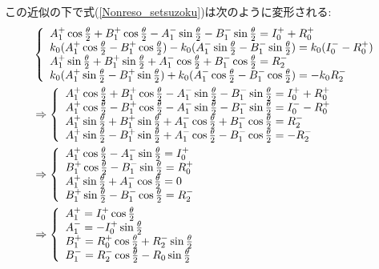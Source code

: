 この近似の下で式(\ref{Nonreso_setsuzoku})は次のように変形される:
\begin{align}
&\left\{\begin{array}{l}
A_1^+ \cos \frac{\theta}{2} +B_1^+\cos \frac{\theta}{2} -A_1^-\sin\frac{\theta}{2} -B_1^-\sin\frac{\theta}{2} = I_0^+ +R_0^+ \\
k_0(A_1^+ \cos \frac{\theta}{2} -B_1^+\cos \frac{\theta}{2} )-k_0(A_1^-\sin\frac{\theta}{2} -B_1^-\sin\frac{\theta}{2} )=k_0(I_0^--R_0^+)\\
A_1^+ \sin \frac{\theta}{2} +B_1^+\sin \frac{\theta}{2} +A_1^-\cos\frac{\theta}{2} +B_1^-\cos\frac{\theta}{2} = R_2^- \\
k_0(A_1^+ \sin \frac{\theta}{2} -B_1^+\sin \frac{\theta}{2}) +k_0(A_1^-\cos\frac{\theta}{2} -B_1^-\cos\frac{\theta}{2}) = -k_0R_2^-
\end{array} \right.  \notag \\
&\Rightarrow \left\{\begin{array}{l}
A_1^+ \cos \frac{\theta}{2} +B_1^+\cos \frac{\theta}{2} -A_1^-\sin\frac{\theta}{2} -B_1^-\sin\frac{\theta}{2} = I_0^+ +R_0^+ \\
A_1^+ \cos \frac{\theta}{2} -B_1^+\cos \frac{\theta}{2} -A_1^-\sin\frac{\theta}{2} -B_1^-\sin\frac{\theta}{2} =I_0^--R_0^+\\
A_1^+ \sin \frac{\theta}{2} +B_1^+\sin \frac{\theta}{2} +A_1^-\cos\frac{\theta}{2} +B_1^-\cos\frac{\theta}{2} = R_2^- \\
A_1^+ \sin \frac{\theta}{2} -B_1^+\sin \frac{\theta}{2} +A_1^-\cos\frac{\theta}{2} -B_1^-\cos\frac{\theta}{2} = -R_2^-
\end{array} \right.  \notag \\
&\Rightarrow \left\{\begin{array}{l}
A_1^+ \cos \frac{\theta}{2} -A_1^-\sin\frac{\theta}{2}= I_0^+ \\
B_1^+\cos \frac{\theta}{2} -B_1^-\sin\frac{\theta}{2} =R_0^+\\
A_1^+ \sin \frac{\theta}{2}+A_1^-\cos\frac{\theta}{2}= 0 \\
B_1^+\sin \frac{\theta}{2} -B_1^-\cos\frac{\theta}{2} = R_2^-
\end{array} \right.  \notag \\
&\Rightarrow \left\{\begin{array}{l}
A_1^+ = I_0^+\cos\frac{\theta}{2} \\
A_1^- =-I_0^+\sin\frac{\theta}{2} \\
B_1^+=R_0^+\cos\frac{\theta}{2}+R_2^-\sin\frac{\theta}{2} \\
B_1^-=R_2^-\cos\frac{\theta}{2}-R_0\sin\frac{\theta}{2}
\end{array} \right. \label{Nonreso_1and2}
\end{align}


